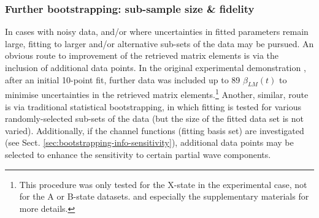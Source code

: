 









\subsubsection{Further bootstrapping: sub-sample size \& fidelity}

In cases with noisy data, and/or where uncertainties in fitted parameters remain large, fitting to larger and/or alternative sub-sets of the data may be pursued.
An obvious route to improvement of the retrieved matrix elements is via the inclusion of additional data points. In the original experimental demonstration \cite{marceau2017MolecularFrameReconstruction}, after an initial 10-point fit, further data was included up to 89 $\beta_{LM}(t)$ to minimise uncertainties in the retrieved matrix elements.\footnote{This procedure was only tested for the X-state in the experimental case, not for the A or B-state datasets. %
and especially the supplementary materials for more details.} Another, similar, route is via traditional statistical bootstrapping, in which fitting is tested for various randomly-selected sub-sets of the data (but the size of the fitted data set is not varied). Additionally, if the channel functions (fitting basis set) are investigated (see Sect. \ref{sec:bootstrapping-info-sensitivity}), additional data points may be selected to enhance the sensitivity to certain partial wave components.

